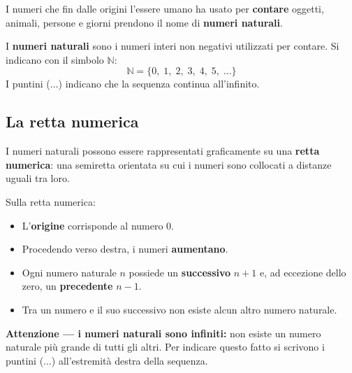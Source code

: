 I numeri che fin dalle origini l'essere umano ha usato per \textbf{contare}
oggetti, animali, persone e giorni prendono il nome di \textbf{numeri naturali}.

\begin{definizione}
  I \textbf{numeri naturali} sono i numeri interi non negativi utilizzati per contare.
  Si indicano con il simbolo $\mathbb{N}$:
  \[
    \mathbb{N} = \{0,\; 1,\; 2,\; 3,\; 4,\; 5,\; \ldots\}
  \]
  I puntini ($\ldots$) indicano che la sequenza continua all'infinito.
\end{definizione}

\subsection{La retta numerica}

I numeri naturali possono essere rappresentati graficamente su una
\textbf{retta numerica}: una semiretta orientata su cui i numeri
sono collocati a distanze uguali tra loro.

\medskip

\begin{center}
\end{center}

\begin{regola}
  Sulla retta numerica:
  \begin{itemize}
    \item L'\textbf{origine} corrisponde al numero $0$.
    \item Procedendo verso destra, i numeri \textbf{aumentano}.
    \item Ogni numero naturale $n$ possiede un \textbf{successivo} $n + 1$
          e, ad eccezione dello zero, un \textbf{precedente} $n - 1$.
    \item Tra un numero e il suo successivo non esiste alcun altro numero naturale.
  \end{itemize}
\end{regola}

\begin{attenzione}
  \textbf{Attenzione — i numeri naturali sono infiniti:}
  non esiste un numero naturale più grande di tutti gli altri.
  Per indicare questo fatto si scrivono i puntini ($\ldots$)
  all'estremità destra della sequenza.
\end{attenzione}

